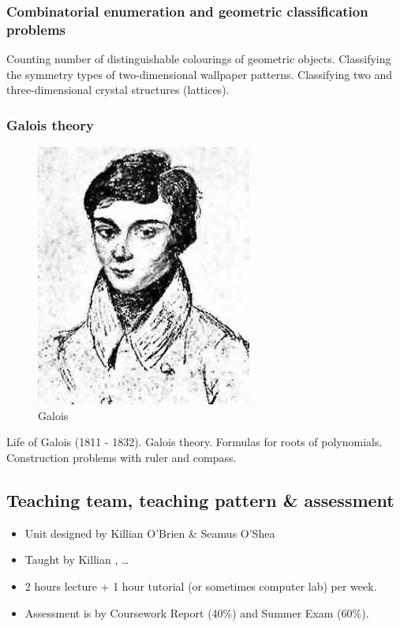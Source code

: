\subsubsection{Combinatorial enumeration and geometric classification
problems}\label{combinatorial-enumeration-and-geometric-classification-problems}

Counting number of distinguishable colourings of geometric objects.
Classifying the symmetry types of two-dimensional wallpaper patterns.
Classifying two and three-dimensional crystal structures (lattices).

\subsubsection{Galois theory}\label{galois-theory}

\begin{figure}[htbp]
\centering
\includegraphics{./Galois.jpeg}
\caption{Galois}
\end{figure}

Life of Galois (1811 - 1832). Galois theory. Formulas for roots of
polynomials. Construction problems with ruler and compass.

\subsection{Teaching team, teaching pattern \&
assessment}\label{teaching-team-teaching-pattern-assessment}

\begin{itemize}
\item
  Unit designed by Killian O'Brien \& Seamus O'Shea
\item
  Taught by Killian , \ldots{}
\item
  2 hours lecture + 1 hour tutorial (or sometimes computer lab) per
  week.
\item
  Assessment is by Coursework Report (40\%) and Summer Exam (60\%).
\end{itemize}

